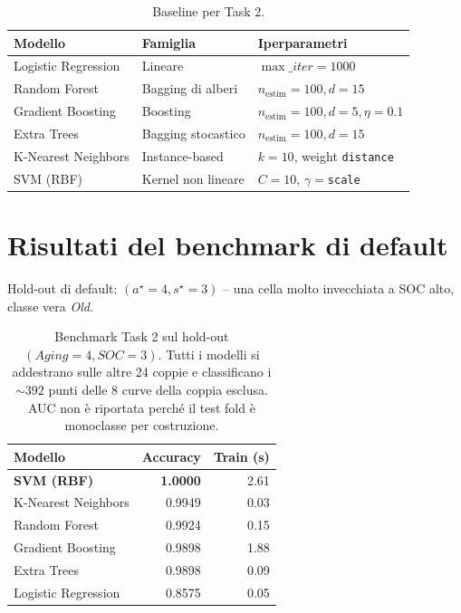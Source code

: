 \begin{table}[H]
  \centering
  \caption{Baseline per Task 2.}
  \label{tab:task2-models}
  \begin{tabularx}{\linewidth}{lXl}
    \toprule
    \textbf{Modello} & \textbf{Famiglia} & \textbf{Iperparametri} \\
    \midrule
    Logistic Regression & Lineare & $\max\_iter = 1000$ \\
    Random Forest~\cite{breiman2001random} & Bagging di alberi & $n_\text{estim}=100, d=15$ \\
    Gradient Boosting~\cite{friedman2001greedy} & Boosting & $n_\text{estim}=100, d=5, \eta=0.1$ \\
    Extra Trees & Bagging stocastico & $n_\text{estim}=100, d=15$ \\
    K-Nearest Neighbors & Instance-based & $k=10$, weight \texttt{distance} \\
    SVM (RBF)~\cite{cortes1995support} & Kernel non lineare & $C = 10$, $\gamma = $\texttt{scale} \\
    \bottomrule
  \end{tabularx}
\end{table}
\newpage
\section{Risultati del benchmark di default}

Hold-out di default: $(a^\star = 4, s^\star = 3)$ -- una cella molto
invecchiata a SOC alto, classe vera \emph{Old}.

\begin{table}[H]
  \centering
  \caption{Benchmark Task 2 sul hold-out $(Aging = 4, SOC = 3)$.
  Tutti i modelli si addestrano sulle altre 24 coppie e classificano i
  ${\sim}392$ punti delle 8 curve della coppia esclusa. AUC non è
  riportata perché il test fold è monoclasse per costruzione.}
  \label{tab:task2-benchmark}
  \begin{tabular}{lrr}
    \toprule
    \textbf{Modello} & Accuracy & Train (s) \\
    \midrule
    \textbf{SVM (RBF)}     & \textbf{1.0000} & 2.61 \\
    K-Nearest Neighbors    & 0.9949 & 0.03 \\
    Random Forest          & 0.9924 & 0.15 \\
    Gradient Boosting      & 0.9898 & 1.88 \\
    Extra Trees            & 0.9898 & 0.09 \\
    Logistic Regression    & 0.8575 & 0.05 \\
    \bottomrule
  \end{tabular}
\end{table}

